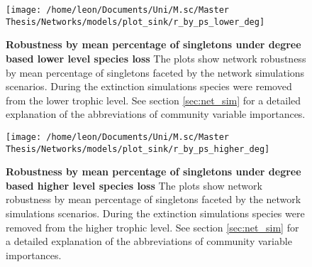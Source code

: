 \documentclass[12pt,a4paper]{article}
\begin{document}
\begin{figure}[H]
	 \centering
	 \texttt{[image: /home/leon/Documents/Uni/M.sc/Master Thesis/Networks/models/plot\_sink/r\_by\_ps\_lower\_deg]}
	 \captionsetup{width = .8\textwidth}
	 \caption[Robustness by mean percentage of singletons under degree based lower level species loss]{\textbf{Robustness by mean percentage of singletons under degree based lower level species loss} The plots show network robustness by mean percentage of singletons faceted by the network simulations scenarios. During the extinction simulations species were removed from the lower trophic level. See section \ref{sec:net_sim} for a detailed explanation of the abbreviations of community variable importances.}
	 \label{fig:r_by_ps_lower_deg}
\end{figure}

\begin{figure}[H]
	 \centering
	 \texttt{[image: /home/leon/Documents/Uni/M.sc/Master Thesis/Networks/models/plot\_sink/r\_by\_ps\_higher\_deg]}
	 	 \captionsetup{width = .8\textwidth}
	 \caption[Robustness by mean percentage of singletons under degree based higher level species loss]{\textbf{Robustness by mean percentage of singletons under degree based higher level species loss} The plots show network robustness by mean percentage of singletons faceted by the network simulations scenarios. During the extinction simulations species were removed from the higher trophic level. See section \ref{sec:net_sim} for a detailed explanation of the abbreviations of community variable importances.}
	 \label{fig:r_by_ps_higher_deg}
\end{figure}



\end{document}
